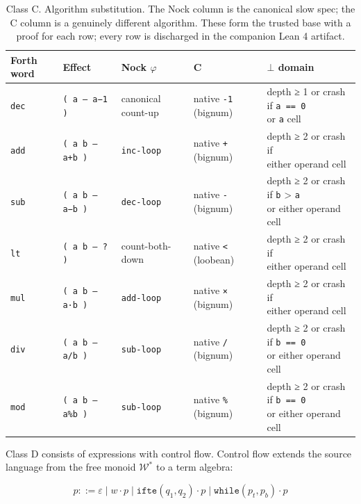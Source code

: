 \documentclass[twoside]{article}
\begin{document}
\begin{table}
\centering
\caption{Class C.  Algorithm substitution.  The Nock column is the canonical slow spec; the C column is a genuinely different algorithm.  These form the trusted base with a proof for each row; every row is discharged in the companion Lean 4 artifact.}
\label{tbl:forth-c}
\begin{tabular}{lllll}
\toprule
Forth word & Effect & Nock $\varphi$ & C & $\bot$ domain \\ \midrule
\texttt{dec} & \texttt{( a — a−1 )} & canonical count-up & native \texttt{-1} (bignum) & \makecell[l]{depth ≥ 1 or crash if \texttt{a == 0}\\or \texttt{a} cell} \\
\texttt{add} & \texttt{( a b — a+b )} & \texttt{inc-loop} & native \texttt{+} (bignum) & \makecell[l]{depth ≥ 2 or crash if\\either operand cell} \\
\texttt{sub} & \texttt{( a b — a−b )} & \texttt{dec-loop} & native \texttt{-} (bignum) & \makecell[l]{depth ≥ 2 or crash if \texttt{b} > \texttt{a}\\or either operand cell} \\
\texttt{lt} & \texttt{( a b — ? )} & count-both-down & native \texttt{<} (loobean) & \makecell[l]{depth ≥ 2 or crash if\\either operand cell} \\
\texttt{mul} & \texttt{( a b — a·b )} & \texttt{add-loop} & native \texttt{×} (bignum) & \makecell[l]{depth ≥ 2 or crash if\\either operand cell} \\
\texttt{div} & \texttt{( a b — a/b )} & \texttt{sub-loop} & native \texttt{/} (bignum) & \makecell[l]{depth ≥ 2 or crash if \texttt{b == 0}\\or either operand cell} \\
\texttt{mod} & \texttt{( a b — a\%b )} & \texttt{sub-loop} & native \texttt{\%} (bignum) & \makecell[l]{depth ≥ 2 or crash if \texttt{b == 0}\\or either operand cell} \\
\bottomrule
\end{tabular}
\end{table}

Class D consists of expressions with control flow.  Control flow extends the source language from the free monoid $\mathcal{W}^*$ to a term algebra:

\begin{equation}\label{eqn:classd-grammar}
  p ::= \varepsilon \mid w \cdot p \mid \texttt{ifte}(q_1, q_2) \cdot p \mid \texttt{while}(p_t, p_b) \cdot p
\end{equation}
\end{document}
